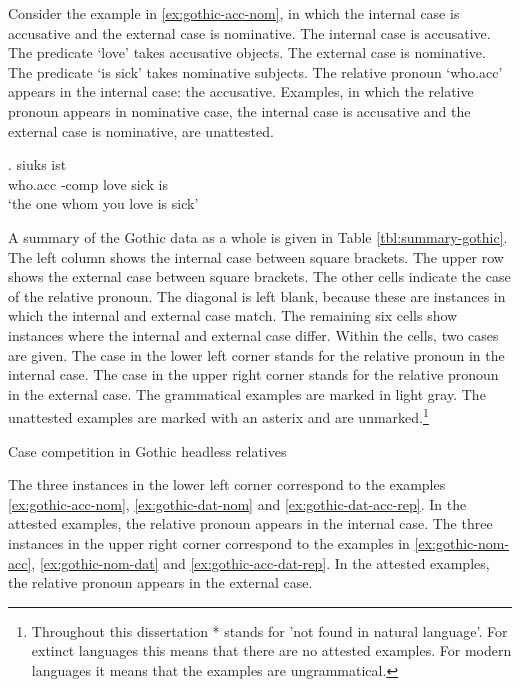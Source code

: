 Consider the example in \ref{ex:gothic-acc-nom}, in which the internal case is accusative and the external case is nominative.
The internal case is accusative. The predicate  `love' takes accusative objects.
The external case is nominative. The predicate  `is sick' takes nominative subjects.
The relative pronoun  `who.\ac{acc}' appears in the internal case: the accusative.
Examples, in which the relative pronoun appears in nominative case, the internal case is accusative and the external case is nominative, are unattested.

\exg.    siuks ist\\
 who.\ac{acc} -\ac{comp} love\scsub{[acc]} sick is\scsub{[nom]}\\
 `the one whom you love is sick' \label{ex:gothic-acc-nom}

A summary of the Gothic data as a whole is given in Table \ref{tbl:summary-gothic}. The left column shows the internal case between square brackets. The upper row shows the external case between square brackets. The other cells indicate the case of the relative pronoun. The diagonal is left blank, because these are instances in which the internal and external case match.
The remaining six cells show instances where the internal and external case differ. Within the cells, two cases are given. The case in the lower left corner stands for the relative pronoun in the internal case. The case in the upper right corner stands for the relative pronoun in the external case. The grammatical examples are marked in light gray. The unattested examples are marked with an asterix and are unmarked.\footnote{
Throughout this dissertation * stands for 'not found in natural language'. For extinct languages this means that there are no attested examples. For modern languages it means that the examples are ungrammatical.
}

\begin{table}[H]
  \center
  \caption {Case competition in Gothic headless relatives}
    
    \label{tbl:summary-gothic}
\end{table}

The three instances in the lower left corner correspond to the examples \ref{ex:gothic-acc-nom}, \ref{ex:gothic-dat-nom} and \ref{ex:gothic-dat-acc-rep}. In the attested examples, the relative pronoun appears in the internal case.
The three instances in the upper right corner correspond to the examples in \ref{ex:gothic-nom-acc}, \ref{ex:gothic-nom-dat} and \ref{ex:gothic-acc-dat-rep}. In the attested examples, the relative pronoun appears in the external case.

